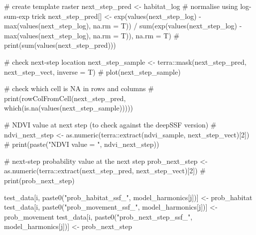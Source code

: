 \documentclass[
  letterpaper,
  DIV=11,
  numbers=noendperiod]{scrartcl}
\newenvironment{Shaded}{\begin{snugshade}}{\end{snugshade}}
\newcommand{\AttributeTok}[1]{\textcolor[rgb]{0.40,0.45,0.13}{#1}}
\newcommand{\CommentTok}[1]{\textcolor[rgb]{0.37,0.37,0.37}{#1}}
\newcommand{\DecValTok}[1]{\textcolor[rgb]{0.68,0.00,0.00}{#1}}
\newcommand{\FunctionTok}[1]{\textcolor[rgb]{0.28,0.35,0.67}{#1}}
\newcommand{\NormalTok}[1]{\textcolor[rgb]{0.00,0.23,0.31}{#1}}
\newcommand{\OtherTok}[1]{\textcolor[rgb]{0.00,0.23,0.31}{#1}}
\newcommand{\SpecialCharTok}[1]{\textcolor[rgb]{0.37,0.37,0.37}{#1}}
\newcommand{\StringTok}[1]{\textcolor[rgb]{0.13,0.47,0.30}{#1}}
\begin{document}
\begin{Shaded}
\begin{Highlighting}[]
      \CommentTok{\# create template raster}
\NormalTok{      next\_step\_pred }\OtherTok{\textless{}{-}}\NormalTok{ habitat\_log}
      \CommentTok{\# normalise using log{-}sum{-}exp trick}
\NormalTok{      next\_step\_pred[] }\OtherTok{\textless{}{-}} \FunctionTok{exp}\NormalTok{(}\FunctionTok{values}\NormalTok{(next\_step\_log) }\SpecialCharTok{{-}} \FunctionTok{max}\NormalTok{(}\FunctionTok{values}\NormalTok{(next\_step\_log), }\AttributeTok{na.rm =}\NormalTok{ T)) }\SpecialCharTok{/} 
        \FunctionTok{sum}\NormalTok{(}\FunctionTok{exp}\NormalTok{(}\FunctionTok{values}\NormalTok{(next\_step\_log) }\SpecialCharTok{{-}} \FunctionTok{max}\NormalTok{(}\FunctionTok{values}\NormalTok{(next\_step\_log), }\AttributeTok{na.rm =}\NormalTok{ T)), }\AttributeTok{na.rm =}\NormalTok{ T)}
      \CommentTok{\# print(sum(values(next\_step\_pred)))}
      
      \CommentTok{\# check next{-}step location}
\NormalTok{      next\_step\_sample }\OtherTok{\textless{}{-}}\NormalTok{ terra}\SpecialCharTok{::}\FunctionTok{mask}\NormalTok{(next\_step\_pred, next\_step\_vect, }\AttributeTok{inverse =}\NormalTok{ T)}
      \CommentTok{\# plot(next\_step\_sample)}
      
      \CommentTok{\# check which cell is NA in rows and columns}
      \CommentTok{\# print(rowColFromCell(next\_step\_pred, which(is.na(values(next\_step\_sample)))))}
      
      \CommentTok{\# NDVI value at next step (to check against the deepSSF version)}
      \CommentTok{\# ndvi\_next\_step \textless{}{-} as.numeric(terra::extract(ndvi\_sample, next\_step\_vect)[2])}
      \CommentTok{\# print(paste("NDVI value = ", ndvi\_next\_step))}
      
      \CommentTok{\# next{-}step probability value at the next step}
\NormalTok{      prob\_next\_step }\OtherTok{\textless{}{-}} \FunctionTok{as.numeric}\NormalTok{(terra}\SpecialCharTok{::}\FunctionTok{extract}\NormalTok{(next\_step\_pred, next\_step\_vect)[}\DecValTok{2}\NormalTok{])}
      \CommentTok{\# print(prob\_next\_step)}
      
\NormalTok{      test\_data[i, }\FunctionTok{paste0}\NormalTok{(}\StringTok{"prob\_habitat\_ssf\_"}\NormalTok{, model\_harmonics[j])] }\OtherTok{\textless{}{-}}\NormalTok{ prob\_habitat}
\NormalTok{      test\_data[i, }\FunctionTok{paste0}\NormalTok{(}\StringTok{"prob\_movement\_ssf\_"}\NormalTok{, model\_harmonics[j])] }\OtherTok{\textless{}{-}}\NormalTok{ prob\_movement}
\NormalTok{      test\_data[i, }\FunctionTok{paste0}\NormalTok{(}\StringTok{"prob\_next\_step\_ssf\_"}\NormalTok{, model\_harmonics[j])] }\OtherTok{\textless{}{-}}\NormalTok{ prob\_next\_step}
      

\end{Highlighting}
\end{Shaded}
\end{document}
